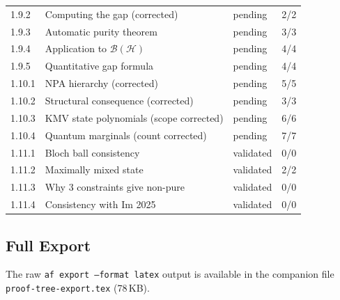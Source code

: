 \documentclass[11pt,a4paper]{article}
\theoremstyle{plain}
\theoremstyle{definition}
\theoremstyle{remark}
\newcommand{\Hilbert}{\mathcal{H}}
\newcommand{\BH}{\mathcal{B}(\Hilbert)}
\begin{document}
\begin{longtable}{lp{6cm}ll}
1.9.2 & Computing the gap (corrected) & pending & 2/2 \\
1.9.3 & Automatic purity theorem & pending & 3/3 \\
1.9.4 & Application to $\BH$ & pending & 4/4 \\
1.9.5 & Quantitative gap formula & pending & 4/4 \\
\midrule
1.10.1 & NPA hierarchy (corrected) & pending & 5/5 \\
1.10.2 & Structural consequence (corrected) & pending & 3/3 \\
1.10.3 & KMV state polynomials (scope corrected) & pending & 6/6 \\
1.10.4 & Quantum marginals (count corrected) & pending & 7/7 \\
\midrule
1.11.1 & Bloch ball consistency & validated & 0/0 \\
1.11.2 & Maximally mixed state & validated & 2/2 \\
1.11.3 & Why 3 constraints give non-pure & validated & 0/0 \\
1.11.4 & Consistency with Im 2025 & validated & 0/0 \\
\end{longtable}

\subsection{Full Export}

The raw \texttt{af export --format latex} output is available in the
companion file \texttt{proof-tree-export.tex} (78\,KB).
\end{document}
